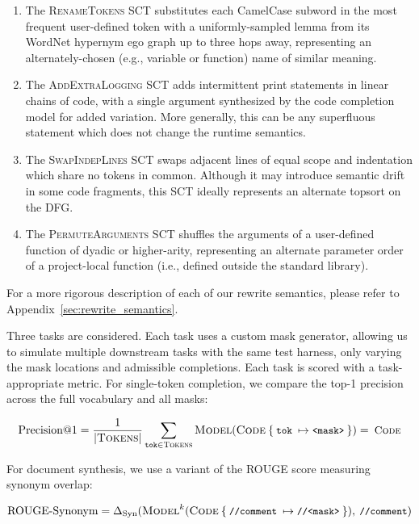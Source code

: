 \documentclass[usenames,dvipsnames]{article} %
\begin{document}
  \begin{enumerate}[itemsep=1ex]
    \item The \textsc{RenameTokens} SCT substitutes each CamelCase subword in the most frequent user-defined token with a uniformly-sampled lemma from its WordNet hypernym ego graph up to three hops away, representing an alternately-chosen (e.g., variable or function) name of similar meaning.
    \item The \textsc{AddExtraLogging} SCT adds intermittent print statements in linear chains of code, with a single argument synthesized by the code completion model for added variation. More generally, this can be any superfluous statement which does not change the runtime semantics.
    \item The \textsc{SwapIndepLines} SCT swaps adjacent lines of equal scope and indentation which share no tokens in common. Although it may introduce semantic drift in some code fragments, this SCT ideally represents an alternate topsort on the DFG.
    \item The \textsc{PermuteArguments} SCT shuffles the arguments of a user-defined function of dyadic or higher-arity, representing an alternate parameter order of a project-local function (i.e., defined outside the standard library).
  \end{enumerate}

  For a more rigorous description of each of our rewrite semantics, please refer to Appendix~\ref{sec:rewrite_semantics}.

  Three tasks are considered. Each task uses a custom mask generator, allowing us to simulate multiple downstream tasks with the same test harness, only varying the mask locations and admissible completions. Each task is scored with a task-appropriate metric. For single-token completion, we compare the top-1 precision across the full vocabulary and all masks:

  \begin{equation*}
    \text{Precision@1} = \frac{1}{{|\textsc{Tokens}|}}\sum_{\texttt{tok}\in \textsc{Tokens}}\textsc{Model}(\textsc{Code}\:\{\:\small{\texttt{tok}}\:\mapsto\small{\texttt{<mask>}}\:\}) = \:\textsc{Code}
  \end{equation*}

  For document synthesis, we use a variant of the ROUGE score measuring synonym overlap:

  \begin{equation*}
    \text{ROUGE-Synonym} = \Delta_{\text{Syn}}(\textsc{Model}^{k}(\textsc{Code}\:\{\:\small{\texttt{//comment}}\:\mapsto\texttt{//<mask>}\:\}), \:\texttt{//comment})
  \end{equation*}
\end{document}

